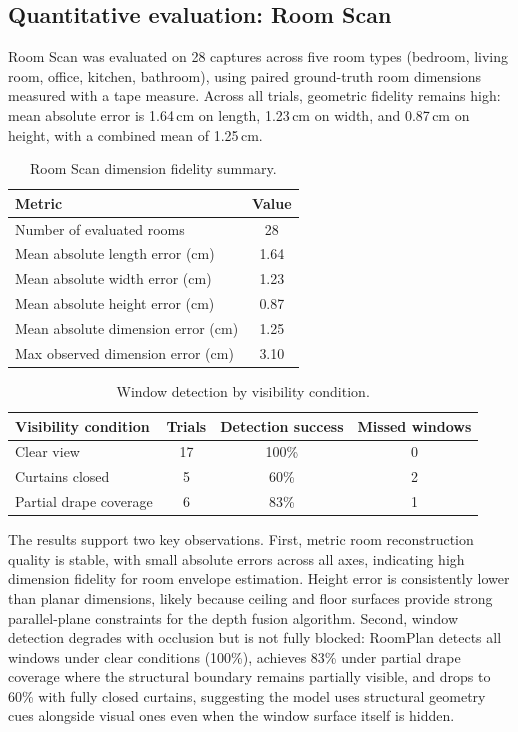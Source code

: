 \subsection{Quantitative evaluation: Room Scan}
\label{sec:room_scan_quant_eval}

Room Scan was evaluated on 28 captures across five room types (bedroom, living room, office, kitchen, bathroom), using paired ground-truth room dimensions measured with a tape measure. Across all trials, geometric fidelity remains high: mean absolute error is 1.64\,cm on length, 1.23\,cm on width, and 0.87\,cm on height, with a combined mean of 1.25\,cm.

\begin{table}[htbp]
\centering
\caption{Room Scan dimension fidelity summary.}
\label{tab:room_scan_summary}
\small
\begin{tabular}{|l|c|}
\hline
\textbf{Metric} & \textbf{Value} \\
\hline
Number of evaluated rooms & 28 \\
\hline
Mean absolute length error (cm) & 1.64 \\
\hline
Mean absolute width error (cm) & 1.23 \\
\hline
Mean absolute height error (cm) & 0.87 \\
\hline
Mean absolute dimension error (cm) & 1.25 \\
\hline
Max observed dimension error (cm) & 3.10 \\
\hline
\end{tabular}
\end{table}

\begin{table}[htbp]
\centering
\caption{Window detection by visibility condition.}
\label{tab:window_visibility}
\small
\begin{tabular}{|l|c|c|c|}
\hline
\textbf{Visibility condition} & \textbf{Trials} & \textbf{Detection success} & \textbf{Missed windows} \\
\hline
Clear view & 17 & 100\% & 0 \\
\hline
Curtains closed & 5 & 60\% & 2 \\
\hline
Partial drape coverage & 6 & 83\% & 1 \\
\hline
\end{tabular}
\end{table}

The results support two key observations. First, metric room reconstruction quality is stable, with small absolute errors across all axes, indicating high dimension fidelity for room envelope estimation. Height error is consistently lower than planar dimensions, likely because ceiling and floor surfaces provide strong parallel-plane constraints for the depth fusion algorithm. Second, window detection degrades with occlusion but is not fully blocked: RoomPlan detects all windows under clear conditions (100\%), achieves 83\% under partial drape coverage where the structural boundary remains partially visible, and drops to 60\% with fully closed curtains, suggesting the model uses structural geometry cues alongside visual ones even when the window surface itself is hidden.

